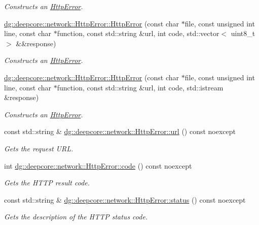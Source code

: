 \begin{DoxyCompactItemize}
\begin{DoxyCompactList}\small\item\em Constructs an \hyperlink{classdg_1_1deepcore_1_1network_1_1_http_error}{Http\+Error}. \end{DoxyCompactList}\item 
\hyperlink{group___network_module_gaacf30b407e830bcfc3a15b14c6bcda3f}{dg\+::deepcore\+::network\+::\+Http\+Error\+::\+Http\+Error} (const char $\ast$file, const unsigned int line, const char $\ast$function, const std\+::string \&url, int code, std\+::vector$<$ uint8\+\_\+t $>$ \&\&response)
\begin{DoxyCompactList}\small\item\em Constructs an \hyperlink{classdg_1_1deepcore_1_1network_1_1_http_error}{Http\+Error}. \end{DoxyCompactList}\item 
\hyperlink{group___network_module_ga45854282cc688af939cbe7d7242661a3}{dg\+::deepcore\+::network\+::\+Http\+Error\+::\+Http\+Error} (const char $\ast$file, const unsigned int line, const char $\ast$function, const std\+::string \&url, int code, std\+::istream \&response)
\begin{DoxyCompactList}\small\item\em Constructs an \hyperlink{classdg_1_1deepcore_1_1network_1_1_http_error}{Http\+Error}. \end{DoxyCompactList}\item 
const std\+::string \& \hyperlink{group___network_module_ga979dcee6ab51c4f6be456ae242c8f90b}{dg\+::deepcore\+::network\+::\+Http\+Error\+::url} () const noexcept
\begin{DoxyCompactList}\small\item\em Gets the request U\+RL. \end{DoxyCompactList}\item 
int \hyperlink{group___network_module_ga7dcace94fa3fc37b1f0f6881438c6446}{dg\+::deepcore\+::network\+::\+Http\+Error\+::code} () const noexcept
\begin{DoxyCompactList}\small\item\em Gets the H\+T\+TP result code. \end{DoxyCompactList}\item 
const std\+::string \& \hyperlink{group___network_module_gadaf5c8fe0e843d50fa5f55a83f6bb0d6}{dg\+::deepcore\+::network\+::\+Http\+Error\+::status} () const noexcept
\begin{DoxyCompactList}\small\item\em Gets the description of the H\+T\+TP status code. \end{DoxyCompactList}\item 

\end{DoxyCompactItemize}
